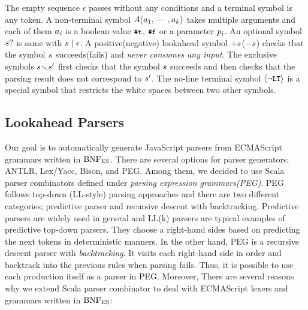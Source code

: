The empty sequence \( \epsilon \) passes without any conditions
and a terminal symbol is any token.
A non-terminal symbol \( A(a_1, \cdots, a_k) \)
takes multiple arguments and each of them \( a_i \) is
a boolean value \( \texttt{\small\#t} \), \( \texttt{\small\#f} \) or a parameter \( p_i \).
An optional symbol \( s? \) is same with \( s \mid \epsilon \).
A positive(negative) lookahead symbol \( +s \)(\( -s \))
checks that the symbol \( s \) succeeds(fails) and
\textit{never consumes any input}.
The exclusive symbols \( s \!\smallsetminus\! s' \)
first checks that the symbol \( s \) succeeds
and then checks that the parsing result does not correspond to \( s' \).
The no-line terminal symbol \( \left<\neg\texttt{\small LT}\right> \) is a special symbol
that restricts the white spaces between two other symbols.

\subsection{Lookahead Parsers}

Our goal is to automatically generate JavaScript parsers from ECMAScript
grammars written in \( \text{BNF}_{\text{ES}} \). There are several options for parser generators;
ANTLR, Lex/Yacc, Bison, and PEG. Among them, we decided to use
Scala parser combinators defined under \textit{parsing expression grammars(PEG)}.
PEG follows top-down (LL-style) parsing approaches and there are two different
categories; predictive parser and recursive descent with backtracking.
Predictive parsers are widely used in general and LL(k) parsers are typical
examples of predictive top-down parsers.
They choose a right-hand sides based on predicting the next tokens in deterministic
manners. In the other hand, PEG is a recursive descent parser with
\textit{backtracking}. It visits each right-hand side in order and backtrack
into the previous rules when parsing fails.
Thus, it is possible to use each production itself as a parser
in PEG. Moreover, There are several reasons why we extend Scala parser combinator
to deal with ECMAScript lexers and grammars written in \( \text{BNF}_{\text{ES}} \):

